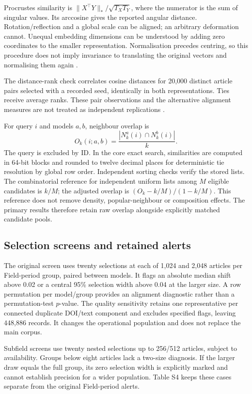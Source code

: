 \documentclass[12pt]{article}
\begin{document}
Procrustes similarity is $\lVert X^\top Y\rVert_*/\sqrt{T_XT_Y}$, where the numerator is the sum of singular values. Its arccosine gives the reported angular distance. Rotation/reflection and a global scale can be aligned; an arbitrary deformation cannot. Unequal embedding dimensions can be understood by adding zero coordinates to the smaller representation. Normalisation precedes centring, so this procedure does not imply invariance to translating the original vectors and normalising them again \citep{NEURIPS2021_252a3dba}.

The distance-rank check correlates cosine distances for 20,000 distinct article pairs selected with a recorded seed, identically in both representations. Ties receive average ranks. These pair observations and the alternative alignment measures are not treated as independent replications \citep{pmlr-v285-williams24a}.

For query $i$ and models $a,b$, neighbour overlap is
\[
O_k(i;a,b)=\frac{|N_k^a(i)\cap N_k^b(i)|}{k}.
\]
The query is excluded by ID. In the core exact search, similarities are computed in 64-bit blocks and rounded to twelve decimal places for deterministic tie resolution by global row order. Independent sorting checks verify the stored lists. The combinatorial reference for independent uniform lists among $M$ eligible candidates is $k/M$; the adjusted overlap is $(O_k-k/M)/(1-k/M)$. This reference does not remove density, popular-neighbour or composition effects. The primary results therefore retain raw overlap alongside explicitly matched candidate pools.

\subsection{Selection screens and retained alerts}
The original screen uses twenty selections at each of 1,024 and 2,048 articles per Field-period group, paired between models. It flags an absolute median shift above 0.02 or a central 95\% selection width above 0.04 at the larger size. A row permutation per model/group provides an alignment diagnostic rather than a permutation-test $p$-value. The quality sensitivity retains one representative per connected duplicate DOI/text component and excludes specified flags, leaving 448,886 records. It changes the operational population and does not replace the main corpus.

Subfield screens use twenty nested selections up to 256/512 articles, subject to availability. Groups below eight articles lack a two-size diagnosis. If the larger draw equals the full group, its zero selection width is explicitly marked and cannot establish precision for a wider population. Table S4 keeps these cases separate from the original Field-period alerts.

\FloatBarrier
\end{document}

